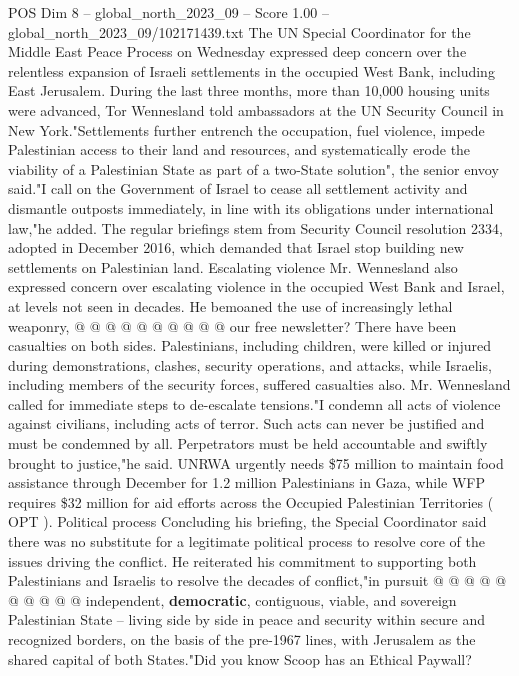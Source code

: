 \begin{textsample}{POS Dim 8 – global\_north\_2023\_09 – Score 1.00 – global\_north\_2023\_09/102171439.txt}  \label{ex:f8_pos_308}
The UN Special Coordinator for the Middle East Peace Process on Wednesday expressed deep concern over the relentless expansion of Israeli settlements in the occupied West Bank, including East Jerusalem.
During the last three months, more than 10,000 housing units were advanced, Tor Wennesland told ambassadors at the UN Security Council in New York."Settlements further entrench the occupation, fuel violence, impede Palestinian access to their land and resources, and systematically erode the viability of a Palestinian State as part of a two-State solution", the senior envoy said."I call on the Government of Israel to cease all settlement activity and dismantle outposts immediately, in line with its obligations under international law,"he added.
The regular briefings stem from Security Council resolution 2334, adopted in December 2016, which demanded that Israel stop building new settlements on Palestinian land.
Escalating violence Mr.
Wennesland also expressed concern over escalating violence in the occupied West Bank and Israel, at levels not seen in decades.
He bemoaned the use of increasingly lethal weaponry, @ @ @ @ @ @ @ @ @ @ our free newsletter?
There have been casualties on both sides.
Palestinians, including children, were killed or injured during demonstrations, clashes, security operations, and attacks, while Israelis, including members of the security forces, suffered casualties also.
Mr.
Wennesland called for immediate steps to de-escalate tensions."I condemn all acts of violence against civilians, including acts of terror.
Such acts can never be justified and must be condemned by all.
Perpetrators must be held accountable and swiftly brought to justice,"he said.
UNRWA urgently needs \$75 million to maintain food assistance through December for 1.2 million Palestinians in Gaza, while WFP requires \$32 million for aid efforts across the Occupied Palestinian Territories ( OPT ).
Political process Concluding his briefing, the Special Coordinator said there was no substitute for a legitimate political process to resolve core of the issues driving the conflict.
He reiterated his commitment to supporting both Palestinians and Israelis to resolve the decades of conflict,"in pursuit @ @ @ @ @ @ @ @ @ @ independent, \textbf{democratic}, contiguous, viable, and sovereign Palestinian State -- living side by side in peace and security within secure and recognized borders, on the basis of the pre-1967 lines, with Jerusalem as the shared capital of both States."Did you know Scoop has an Ethical Paywall?

\end{textsample}
